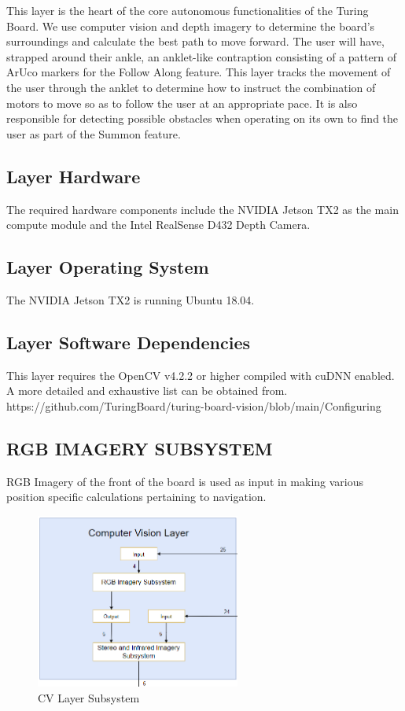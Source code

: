 This layer is the heart of the core autonomous functionalities of the Turing Board. We use computer
vision and depth imagery to determine the board’s surroundings and calculate the best path to move
forward. The user will have, strapped around their ankle, an anklet-like contraption consisting of a
pattern of ArUco markers for the Follow Along feature. This layer tracks the movement of the user
through the anklet to determine how to instruct the combination of motors to move so as to follow the
user at an appropriate pace. It is also responsible for detecting possible obstacles when operating on its
own to find the user as part of the Summon feature.
\subsection{Layer Hardware}
The required hardware components include the NVIDIA Jetson TX2 as the main compute module and the Intel RealSense  D432 Depth Camera.

\subsection{Layer Operating System}
The NVIDIA Jetson TX2 is running Ubuntu 18.04. 

\subsection{Layer Software Dependencies}
This layer requires the OpenCV v4.2.2 or higher compiled with cuDNN enabled. A more detailed and exhaustive list can be obtained from. https://github.com/TuringBoard/turing-board-vision/blob/main/Configuring%

\subsection{RGB IMAGERY SUBSYSTEM}
RGB Imagery of the front of the board is used as input in making various position specific calculations pertaining to navigation.

\begin{figure}[h!]
	\centering
 	\includegraphics[width=0.60\textwidth]{images/CV.png} %
 \caption{CV Layer Subsystem} %
\end{figure}

